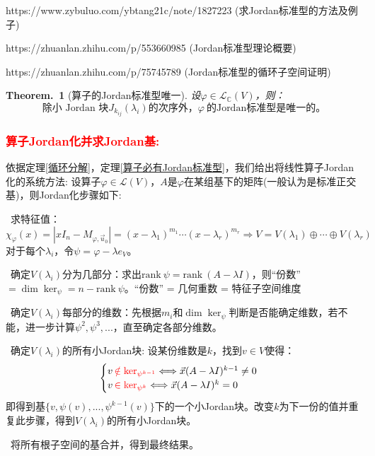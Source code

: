 \documentclass[zihao=5,UTF8]{report}
\theoremstyle{mystyle} %
\newtheorem{theorem}{Theorem.\,}
\begin{document}
https://www.zybuluo.com/ybtang21c/note/1827223 (求Jordan标准型的方法及例子) \par
https://zhuanlan.zhihu.com/p/553660985 (Jordan标准型理论概要)\par
https://zhuanlan.zhihu.com/p/75745789 (Jordan标准型的循环子空间证明)
\begin{theorem}[算子的Jordan标准型唯一]
设$\varphi \in \mathscr{L}_{\mathbb{C}}(V)$，则：
\begin{equation*}
    \text{除小 Jordan 块$J_{k_{ij}}(\lambda_i)$的次序外，}\varphi\  \text{的Jordan标准型是唯一的。}
\end{equation*}
\end{theorem}
\subsubsection{\textcolor{red}{算子Jordan化并求Jordan基: }}
依据定理\ref{循环分解}，定理\ref{算子必有Jordan标准型}，我们给出将线性算子Jordan化的系统方法: 
设算子$\varphi \in \mathscr{L}(V)$，$A$是$\varphi$在某组基下的矩阵(一般认为是标准正交基)，则Jordan化步骤如下: \par
{}\ 求特征值：$\chi_{\varphi}(x) = \left | xI_n - M_{\varphi,\vec{u}_0}\right | =(x-\lambda_1)^{m_1} \cdots (x-\lambda_r)^{m_r} \Longrightarrow V = V(\lambda_1) \oplus \cdots \oplus V(\lambda_r)$\\
对于每个$\lambda_i$，令$\psi = \varphi -\lambda e_V$。 \par
{}\ 确定$V(\lambda_i)$分为几部分：求出$\text{rank}\ \psi = \text{rank}\ (A -\lambda I) $，则“份数”$ = \dim \ker_{\psi} = n - \text{rank}\ \psi$。{\color{gray}\small “份数” = 几何重数 = 特征子空间维度}
\par
{}\ 确定$V(\lambda_i)$每部分的维数：先根据$m_i$和$\dim \ker_{\psi}$判断是否能确定维数，若不能，进一步计算$\psi^2,\psi^3,...$，直至确定各部分维数。\par
{}\ 确定$V(\lambda_i)$的所有小Jordan块: 设某份维数是$k$，找到$v \in V$使得：
\begin{equation*}
    \begin{cases}
        v\, \textcolor{red}{\notin\ker_{\psi^{k-1}}} \Longleftrightarrow \vec{x}(A - \lambda I)^{k-1} \ne 0 \\
        v\,  \textcolor{red}{\in \ker_{\psi^{k}} }\Longleftrightarrow\vec{x}(A - \lambda I)^{k} = 0 
    \end{cases}
\end{equation*}
即得到基$\{v, \psi(v),..., \psi^{k-1}(v)\}$下的一个小Jordan块。改变$k$为下一份的值并重复此步骤，得到$V(\lambda_i)$的所有小Jordan块。
\par
{}\ 将所有根子空间的基合并，得到最终结果。\par
\end{document}
